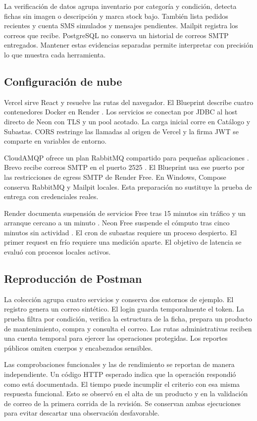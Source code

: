 \documentclass[conference]{IEEEtran}
\begin{document}
La verificación de datos agrupa inventario por categoría y condición, detecta fichas sin imagen o descripción y marca stock bajo. También lista pedidos recientes y cuenta SMS simulados y mensajes pendientes. Mailpit registra los correos que recibe. PostgreSQL no conserva un historial de correos SMTP entregados. Mantener estas evidencias separadas permite interpretar con precisión lo que muestra cada herramienta.

\subsection{Configuración de nube}
Vercel sirve React y resuelve las rutas del navegador. El Blueprint describe cuatro contenedores Docker en Render \cite{renderbp}. Los servicios se conectan por JDBC al host directo de Neon con TLS y un pool acotado. La carga inicial corre en Catálogo y Subastas. CORS restringe las llamadas al origen de Vercel y la firma JWT se comparte en variables de entorno.

CloudAMQP ofrece un plan RabbitMQ compartido para pequeñas aplicaciones \cite{cloudamqp}. Brevo recibe correos SMTP en el puerto 2525 \cite{brevo}. El Blueprint usa ese puerto por las restricciones de egress SMTP de Render Free. En Windows, Compose conserva RabbitMQ y Mailpit locales. Esta preparación no sustituye la prueba de entrega con credenciales reales.

Render documenta suspensión de servicios Free tras 15 minutos sin tráfico y un arranque cercano a un minuto \cite{renderfree}. Neon Free suspende el cómputo tras cinco minutos sin actividad \cite{neon}. El cron de subastas requiere un proceso despierto. El primer request en frío requiere una medición aparte. El objetivo de latencia se evaluó con procesos locales activos.

\subsection{Reproducción de Postman}
La colección agrupa cuatro servicios y conserva dos entornos de ejemplo. El registro genera un correo sintético. El login guarda temporalmente el token. La prueba filtra por condición, verifica la estructura de la ficha, prepara un producto de mantenimiento, compra y consulta el correo. Las rutas administrativas reciben una cuenta temporal para ejercer las operaciones protegidas. Los reportes públicos omiten cuerpos y encabezados sensibles.

Las comprobaciones funcionales y las de rendimiento se reportan de manera independiente. Un código HTTP esperado indica que la operación respondió como está documentada. El tiempo puede incumplir el criterio con esa misma respuesta funcional. Esto se observó en el alta de un producto y en la validación de correo de la primera corrida de la revisión. Se conservan ambas ejecuciones para evitar descartar una observación desfavorable.
\end{document}
